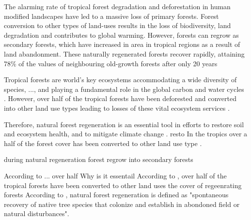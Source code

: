 


The alarming rate of tropical forest degradation and deforestation in human modified landscapes
have led to a massive loss of primary forests. Forest conversion to other types of land-uses results in
the loss of biodiversity, land degradation and contributes to global warming. However, forests can
regrow as secondary forests, which have increased in area in tropical regions as a result of land
abandonment. These naturally regenerated forests recover rapidly, attaining 78\% of the values of
neighbouring old-growth forests after only 20 years


Tropical forests are world's key ecosystems accommodating a wide diversity of species, ..., and playing a fundamental role in the global carbon and water cycles \citep{bormaCarbonContributionsSouth2022}. However, over half of the tropical forests have been deforested and converted into other land use types leading to losses of these vital ecosystem services \citep{chazdonNaturalRegenerationTool2016}. 

Therefore, natural forest regeneration is an essential tool in efforts to restore soil and ecosystem health, and to mitigate climate change \citep{hordijkLandUseHistory2024}.  resto In the tropics over a half of the forest cover has been converted to other land use type \citep{chazdonNaturalRegenerationTool2016}.

during natural regeneration forest regrow into secondary forests

According to ... over half Why is it essentail According to \citet{chazdonNaturalRegenerationTool2016}, over half of the tropical forests have been converted to other land uses the cover of regeenrating forests
According to \citet{crouzeillesEcologicalRestorationSuccess2017}, natural forest regeneration is defined as "spontaneous recovery of native tree species that colonize and establish in abondoned field or natural disturbances".

